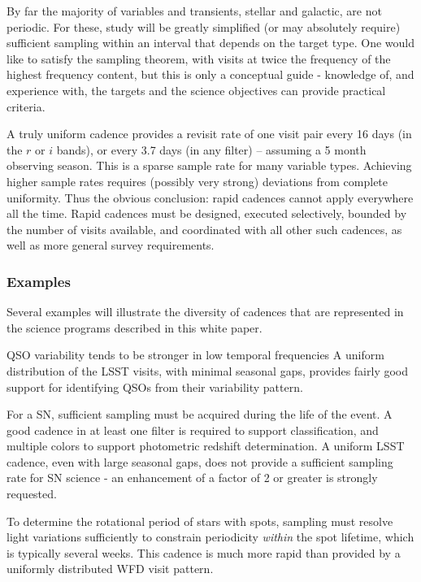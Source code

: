 By far the majority of variables and transients, stellar and galactic,
are not periodic. For these, study will be greatly simplified (or may
absolutely require) sufficient sampling within an interval that depends
on the target type. One would like to satisfy the sampling theorem, with
visits at twice the frequency of the highest frequency content, but this
is only a conceptual guide - knowledge of, and experience with, the
targets and the science objectives can provide practical criteria.

A truly uniform cadence provides a revisit rate of one visit pair every
16 days (in the $r$ or $i$ bands), or every 3.7 days (in any filter) --
assuming a 5 month observing season.  This is a sparse sample rate for
many variable types.  Achieving higher sample rates requires (possibly
very strong) deviations from complete uniformity.  Thus the obvious
conclusion: rapid cadences cannot apply everywhere all the time. Rapid
cadences must be designed, executed selectively, bounded by the number
of visits available, and coordinated with all other such cadences, as
well as more general survey requirements.

\subsubsection{Examples}

Several examples will illustrate the diversity of cadences that are
represented in the science programs described in this white paper.

QSO variability tends to be stronger in low temporal frequencies   A uniform distribution of the
LSST visits, with minimal seasonal gaps, provides fairly good support
for identifying QSOs from their variability pattern.

For a SN, sufficient sampling must be acquired during the life of the
event. A good cadence in at least one filter is required to support
classification, and multiple colors to support photometric redshift
determination.  A uniform LSST cadence, even with large seasonal gaps,
does not provide a sufficient sampling rate for SN science - an
enhancement of a factor of 2 or greater is strongly requested.

To determine the rotational period of stars with spots, sampling must
resolve light variations sufficiently to constrain periodicity {\it
within} the spot lifetime, which is typically several weeks. This
cadence is much more rapid than provided by a uniformly distributed WFD
visit pattern.

